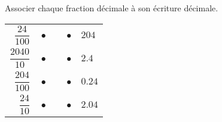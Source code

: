 \begin{exercice}
    Associer chaque fraction décimale à son écriture décimale.
    \begin{center}
       \begin{tabular}{rp{1cm}l}
          $\dfrac{24}{100} \quad \bullet$ & & $\bullet \quad 204$ \\ [4mm]
          $\dfrac{\num{2 040}}{10} \quad \bullet$ & & $\bullet \quad \num{2.4}$ \\ [4mm]
          $\dfrac{204}{100} \quad \bullet$ & & $\bullet \quad \num{0.24}$ \\ [4mm]
          $\dfrac{24}{10} \quad \bullet$ & & $\bullet \quad \num{2.04}$ \\
       \end{tabular}
    \end{center}
 \end{exercice}